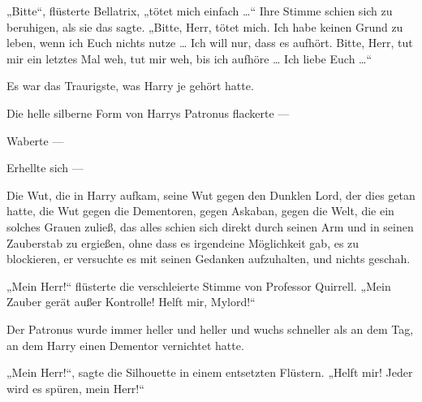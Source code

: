 „Bitte“, flüsterte Bellatrix, „tötet mich einfach …“ Ihre Stimme schien sich zu beruhigen, als sie das sagte.
„Bitte, Herr, tötet mich. Ich habe keinen Grund zu leben, wenn ich Euch nichts nutze … Ich will nur, dass es aufhört. Bitte, Herr, tut mir ein letztes Mal weh, tut mir weh, bis ich aufhöre … Ich liebe Euch …“

Es war das Traurigste, was Harry je gehört hatte.

Die helle silberne Form von Harrys Patronus flackerte —

Waberte —

Erhellte sich —

Die Wut, die in Harry aufkam, seine Wut gegen den Dunklen Lord, der dies getan hatte, die Wut gegen die Dementoren, gegen Askaban, gegen die Welt, die ein solches Grauen zuließ, das alles schien sich direkt durch seinen Arm und in seinen Zauberstab zu ergießen, ohne dass es irgendeine Möglichkeit gab, es zu blockieren, er versuchte es mit seinen Gedanken aufzuhalten, und nichts geschah.

„Mein Herr!“ flüsterte die verschleierte Stimme von Professor Quirrell.
„Mein Zauber gerät außer Kontrolle! Helft mir, Mylord!“

Der Patronus wurde immer heller und heller und wuchs schneller als an dem Tag, an dem Harry einen Dementor vernichtet hatte.

„Mein Herr!“, sagte die Silhouette in einem entsetzten Flüstern.
„Helft mir! Jeder wird es spüren, mein Herr!“


